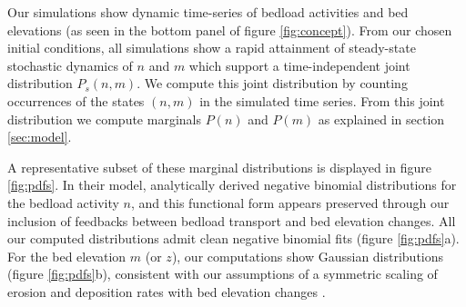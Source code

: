 \documentclass[draft]{agujournal2018}
\begin{document}

Our simulations show dynamic time-series of bedload activities and bed elevations (as seen in the bottom panel of figure \ref{fig:concept}).
From our chosen initial conditions, all simulations show a rapid attainment of steady-state stochastic dynamics of $n$ and $m$ which support a time-independent joint distribution $P_s(n,m)$. 
We compute this joint distribution by counting occurrences of the states $(n,m)$ in the simulated time series.
From this joint distribution we compute marginals $P(n)$ and $P(m)$ as explained in section \ref{sec:model}.

A representative subset of these marginal distributions is displayed in figure \ref{fig:pdfs}.
In their model, \citet{Ancey2008} analytically derived negative binomial distributions for the bedload activity $n$, and this functional form appears preserved through our inclusion of feedbacks between bedload transport and bed elevation changes.
All our computed distributions admit clean negative binomial fits (figure \ref{fig:pdfs}a).
For the bed elevation $m$ (or $z$), our computations show Gaussian distributions (figure \ref{fig:pdfs}b), consistent with our assumptions of a symmetric scaling of erosion and deposition rates with bed elevation changes \citep[e.g.][]{Wong2007}.
\end{document}
